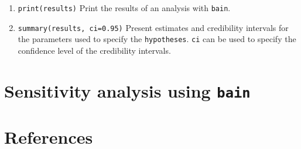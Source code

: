 \documentclass[
]{book}
\providecommand{\tightlist}{%
  \setlength{\itemsep}{0pt}\setlength{\parskip}{0pt}}
\begin{document}
\begin{enumerate}
\def\labelenumi{\arabic{enumi})}
\setcounter{enumi}{4}
\tightlist
\item
  \texttt{print(results)} Print the results of an analysis with
  \texttt{bain}.
\item
  \texttt{summary(results,\ ci=0.95)} Present estimates and credibility intervals for the parameters used to specify the \texttt{hypotheses}. \texttt{ci} can be used to specify the confidence level of the credibility intervals.
\end{enumerate}

\hypertarget{sensitivity-analysis-using-bain}{%
\chapter{\texorpdfstring{Sensitivity analysis using \texttt{bain}}{Sensitivity analysis using bain}}\label{sensitivity-analysis-using-bain}}

\hypertarget{references}{%
\chapter*{References}\label{references}}
\end{document}
